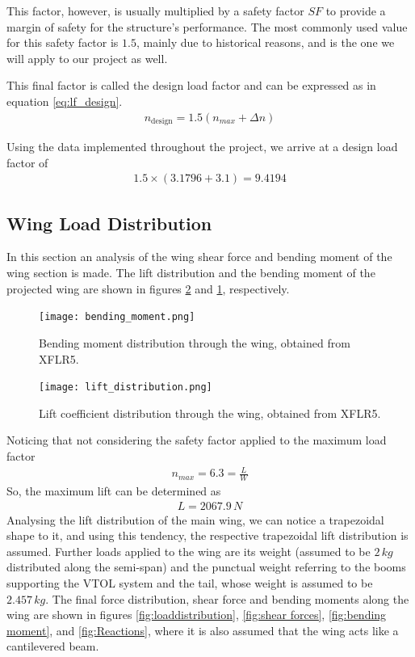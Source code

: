 \documentclass[english,fira]{ist-report}
\begin{document}
This factor, however, is usually multiplied by a safety factor $SF$ to provide a margin of safety for the structure's performance. The most commonly used value for this safety factor is $1.5$, mainly due to historical reasons, and is the one we will apply to our project as well.

This final factor is called the design load factor and can be expressed as in equation \ref{eq:lf_design}.
\begin{gather}\label{eq:lf_design}
    n_{\text{design}} = 1.5\left(n_{max} + \Delta n\right)
\end{gather}

Using the data implemented throughout the project, we arrive at a design load factor of
\begin{gather}
    1.5\times(3.1796 + 3.1) = 9.4194
\end{gather}

\subsection{Wing Load Distribution}

In this section an analysis of the wing shear force and bending moment of the wing section is made. The lift distribution and the bending moment of the projected wing are shown in figures \ref{fig:liftdistribution} and \ref{fig:momentdistribution}, respectively.

\begin{figure}[!ht]
    \centering
    \texttt{[image: bending\_moment.png]}
    \caption{Bending moment distribution through the wing, obtained from XFLR5.}
    \label{fig:momentdistribution}
\end{figure}

\begin{figure}[!ht]
    \centering
    \texttt{[image: lift\_distribution.png]}
    \caption{Lift coefficient distribution through the wing, obtained from XFLR5.}
    \label{fig:liftdistribution}
\end{figure}

Noticing that not considering the safety factor applied to the maximum load factor
\begin{gather}
    n_{max}=6.3=\frac{L}{W}
\end{gather}
So, the maximum lift can be determined as
\begin{gather}
    L = 2067.9\,N
\end{gather}
Analysing the lift distribution of the main wing, we can notice a trapezoidal shape to it, and using this tendency, the respective trapezoidal lift distribution is assumed. Further loads applied to the wing are its weight (assumed to be $2\,kg$ distributed along the semi-span) and the punctual weight referring to the booms supporting the VTOL system and the tail, whose weight is assumed to be $2.457\,kg$. The final force distribution, shear force and bending moments along the wing are shown in figures \ref{fig:loaddistribution}, \ref{fig:shear forces}, \ref{fig:bending moment}, and \ref{fig:Reactions}, where it is also assumed that the wing acts like a cantilevered beam.
\end{document}
